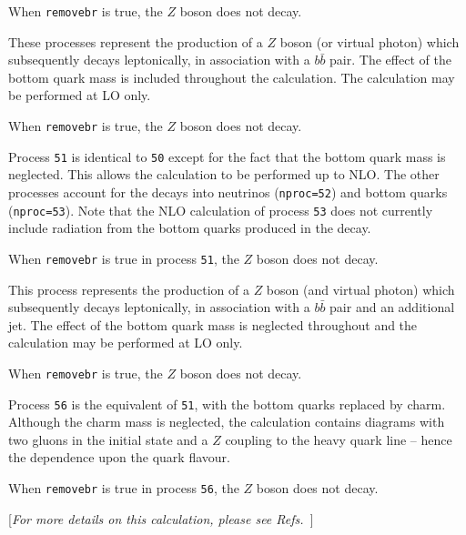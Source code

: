 When {\tt removebr} is true, the $Z$ boson does not decay.

\label{subsec:zbb}

These processes represent the production of a $Z$ boson (or virtual photon)
which subsequently decays leptonically, in association
with a $b{\bar b}$ pair. The effect of
the bottom quark mass is included throughout the calculation.  
The calculation may be performed at LO only.

When {\tt removebr} is true, the $Z$ boson does not decay.

\label{subsec:zbbmassless}

Process {\tt 51} is identical to {\tt 50} except for the fact
that the bottom quark mass is neglected. This allows the calculation to be
performed up to NLO. The other processes account for the decays into
neutrinos ({\tt nproc=52}) and bottom quarks ({\tt nproc=53}). Note that
the NLO calculation of process {\tt 53} does not currently 
include radiation from the
bottom quarks produced in the decay.

When {\tt removebr} is true in process {\tt 51}, the $Z$ boson does not decay.

\label{subsec:zbbjetmassless}

This process represents the production of a $Z$ boson (and virtual photon)
which subsequently decays leptonically, in association
with a $b{\bar b}$ pair and an additional jet.
The effect of the bottom quark mass is neglected throughout
and the calculation may be performed at LO only.

When {\tt removebr} is true, the $Z$ boson does not decay.

\label{subsec:zccmassless}

Process {\tt 56} is the equivalent of {\tt 51}, with the bottom quarks
replaced by charm. Although the charm mass is neglected, the calculation
contains diagrams with two gluons in the initial state and a
$Z$ coupling to the heavy quark line -- hence the dependence upon the quark
flavour.

When {\tt removebr} is true in process {\tt 56}, the $Z$ boson does not decay.

\label{subsec:diboson}

\begin{center}
[{\it For more details on this calculation, please see Refs.~\cite{Campbell:1999ah,Campbell:2011bn}}]
\end{center}


